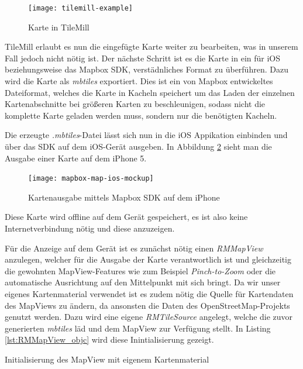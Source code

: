 \begin{figure}[htb!]
	\centering
	\texttt{[image: tilemill-example]}
	\caption{Karte in TileMill}
	\label{tilemill-example}
\end{figure}

TileMill erlaubt es nun die eingefügte Karte weiter zu bearbeiten, was in unserem Fall jedoch nicht nötig ist.
Der nächste Schritt ist es die Karte in ein für iOS beziehungsweise das Mapbox SDK, verstädnliches Format zu überführen.
Dazu wird die Karte als \emph{mbtiles} exportiert. Dies ist ein von Mapbox entwickeltes Dateiformat, welches die Karte in Kacheln speichert um das Laden der einzelnen Kartenabschnitte bei größeren Karten zu beschleunigen, sodass nicht die komplette Karte geladen werden muss, sondern nur die benötigten Kacheln.

Die erzeugte \emph{.mbtiles}-Datei lässt sich nun in die iOS Appikation einbinden und über das SDK auf dem iOS-Gerät ausgeben. In Abbildung \ref{mapbox-map-ios} sieht man die Ausgabe einer Karte auf dem iPhone 5.

\begin{figure}[htb!]
		\centering
	\texttt{[image: mapbox-map-ios-mockup]}
	\caption{Kartenausgabe mittels Mapbox SDK auf dem iPhone}
	\label{mapbox-map-ios}
\end{figure}

Diese Karte wird offline auf dem Gerät gespeichert, es ist also keine Internetverbindung nötig und diese anzuzeigen.

Für die Anzeige auf dem Gerät ist es zunächst nötig einen \emph{RMMapView} anzulegen, welcher für die Ausgabe der Karte verantwortlich ist und gleichzeitig die gewohnten MapView-Features wie zum Beispiel \emph{Pinch-to-Zoom} oder die automatische Ausrichtung auf den Mittelpunkt mit sich bringt.
Da wir unser eigenes Kartenmaterial verwendet ist es zudem nötig die Quelle für Kartendaten des MapViews zu ändern, da ansonsten die Daten des OpenStreetMap-Projekts genutzt werden. Dazu wird eine eigene \emph{RMTileSource} angelegt, welche die zuvor generierten \emph{mbtiles} läd und dem MapView zur Verfügung stellt. 
In Listing \ref{lst:RMMapView_objc} wird diese Inintialisierung gezeigt.

\begin{listing}[htb! breaklines=true]
    \caption{Initialisierung des MapView mit eigenem Kartenmaterial}
	\label{lst:RMMapView_objc}
\end{listing}

